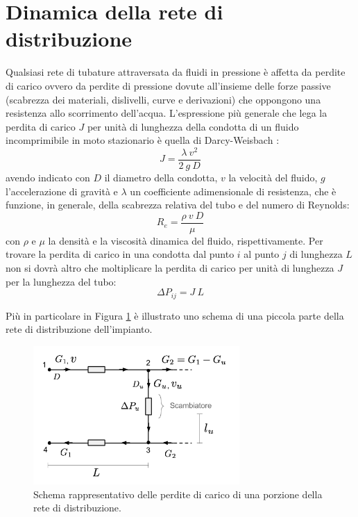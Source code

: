 \documentclass[laurea,oneside,11pt]{USiena_tesiLM}
\begin{document}
\section{Dinamica della rete di distribuzione}
Qualsiasi rete di tubature attraversata da fluidi in pressione è affetta da perdite di carico ovvero da perdite di pressione dovute all'insieme delle forze passive (scabrezza dei materiali, dislivelli, curve e derivazioni) che oppongono una resistenza allo scorrimento dell'acqua. L'espressione più generale che lega la perdita di carico $J$ per unità di lunghezza della condotta di un fluido incomprimibile in moto stazionario è quella di Darcy-Weisbach \cite{darcy}:
\begin{equation}
J = \frac{\lambda \ v^2}{2 \ g \ D}
\end{equation}
avendo indicato con $D$ il diametro della condotta, $v$ la velocità del fluido, $g$ l'accelerazione di gravità e $\lambda$ un coefficiente adimensionale di resistenza, che è funzione, in generale, della scabrezza relativa del tubo e del numero di Reynolds:
\begin{equation}
R_e = \frac{\rho \ v \ D}{\mu}
\end{equation}
con $\rho$ e $\mu$ la densità e la viscosità dinamica del fluido, rispettivamente. 
Per trovare la perdita di carico in una condotta dal punto $i$ al punto $j$ di lunghezza $L$ non si dovrà altro che moltiplicare la perdita di carico per unità di lunghezza $J$ per la lunghezza del tubo:
\begin{equation}
\Delta P_{ij} = J \ L
\end{equation} 
 
Più in particolare in Figura \ref{fig:perdite_carico} è illustrato uno schema di una piccola parte della rete di distribuzione dell'impianto.

\begin{figure}[h]
\centering
\includegraphics[width=0.70\textwidth]{figure/perdite_carico} %
\caption{Schema rappresentativo delle perdite di carico di una porzione della rete di distribuzione.}
\label{fig:perdite_carico}

\end{figure}
\end{document}
